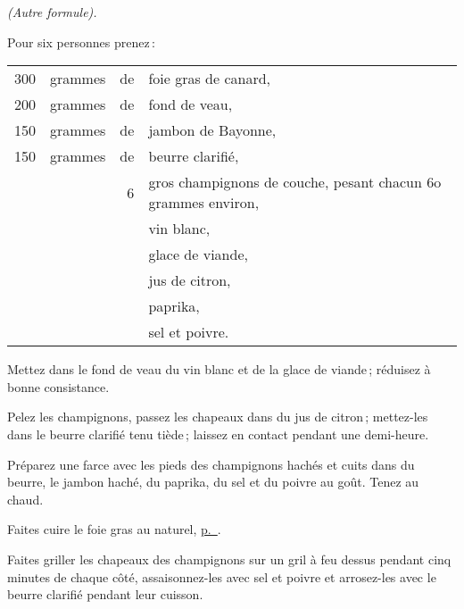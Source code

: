 \begin{center}
\textit{(Autre formule).}
\end{center}

Pour six personnes prenez :

\footnotesize
\begin{longtable}{rrrp{16em}}
    300 & grammes & de & foie gras de canard,                                                             \\
    200 & grammes & de & fond de veau,                                                                    \\
    150 & grammes & de & jambon de Bayonne,                                                               \\
    150 & grammes & de & beurre clarifié,                                                                 \\
        &         &  6 & gros champignons de couche, pesant chacun 6o grammes environ,                    \\
        &         &    & vin blanc,                                                                       \\
        &         &    & glace de viande,                                                                 \\
        &         &    & jus de citron,                                                                   \\
        &         &    & paprika,                                                                         \\
        &         &    & sel et poivre.                                                                   \\
\end{longtable}
\normalsize

Mettez dans le fond de veau du vin blanc et de la glace de viande ; réduisez
à bonne consistance.

Pelez les champignons, passez les chapeaux dans du jus de citron ; mettez-les
dans le beurre clarifié tenu tiède ; laissez en contact pendant une demi-heure.

Préparez une farce avec les pieds des champignons hachés et cuits dans du
beurre, le jambon haché, du paprika, du sel et du poivre au goût. Tenez au
chaud.

Faites cuire le foie gras au naturel, \hyperlink{p0592}{p. \pageref{pg0592}}.

Faites griller les chapeaux des champignons sur un gril à feu dessus pendant
cinq minutes de chaque côté, assaisonnez-les avec sel et poivre et arrosez-les
avec le beurre clarifié pendant leur cuisson.

